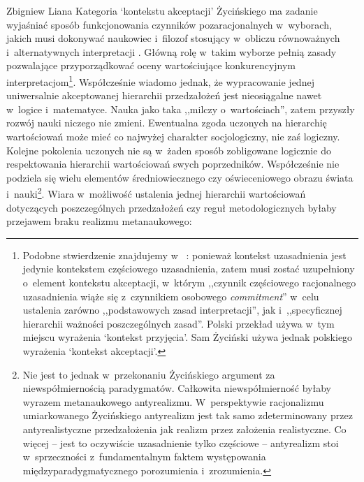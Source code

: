 \begin{artplenv}{Zbigniew Liana}
Kategoria ‘kontekstu akceptacji' Życińskiego ma zadanie wyjaśniać sposób funkcjonowania czynników pozaracjonalnych w~wyborach, jakich musi dokonywać naukowiec i~filozof stosujący w~obliczu równoważnych i~alternatywnych interpretacji
\parencite[][s.~225nn]{zycinski_teizm_1985}. %
 Główną rolę w~takim wyborze pełnią zasady pozwalające przyporządkować oceny wartościujące konkurencyjnym interpretacjom\footnote{Podobne stwierdzenie znajdujemy w~%
\parencites[][s.~137]{zycinski_structure_1988}[][s.~242n]{zycinski_struktura_2013_liana}: %
 ponieważ kontekst uzasadnienia jest jedynie kontekstem częściowego uzasadnienia, zatem musi zostać uzupełniony o~element kontekstu akceptacji, w~którym ,,czynnik częściowego racjonalnego uzasadnienia wiąże się z~czynnikiem osobowego \textit{commitment}'' w~celu ustalenia zarówno ,,podstawowych zasad interpretacji'', jak i~,,specyficznej hierarchii ważności poszczególnych zasad''. Polski przekład 
\parencite[][s.~243]{zycinski_struktura_2013_liana} %
 używa w~tym miejscu wyrażenia ‘kontekst przyjęcia'. Sam Życiński używa jednak polskiego wyrażenia ‘kontekst akceptacji'.}. Współcześnie wiadomo jednak, że wypracowanie jednej uniwersalnie akceptowanej hierarchii przedzałożeń jest nieosiągalne nawet w~logice i~matematyce. Nauka jako taka ,,milczy o~wartościach'', zatem przyszły rozwój nauki niczego nie zmieni. Ewentualna zgoda uczonych na hierarchię wartościowań może mieć co najwyżej charakter socjologiczny, nie zaś logiczny. Kolejne pokolenia uczonych nie są w~żaden sposób zobligowane logicznie do respektowania hierarchii wartościowań swych poprzedników. Współcześnie nie podziela się wielu elementów średniowiecznego czy oświeceniowego obrazu świata i~nauki\footnote{Nie jest to jednak w~przekonaniu Życińskiego argument za niewspółmiernością paradygmatów. Całkowita niewspółmierność byłaby wyrazem metanaukowego antyrealizmu. W~perspektywie racjonalizmu umiarkowanego Życińskiego antyrealizm jest tak samo zdeterminowany przez antyrealistyczne przedzałożenia jak realizm przez założenia realistyczne. Co więcej -- jest to oczywiście uzasadnienie tylko częściowe -- antyrealizm stoi w~sprzeczności z~fundamentalnym faktem występowania międzyparadygmatycznego porozumienia i~zrozumienia.}. Wiara w~możliwość ustalenia jednej hierarchii wartościowań dotyczących poszczególnych przedzałożeń czy reguł metodologicznych byłaby przejawem braku realizmu metanaukowego:


\end{artplenv}
